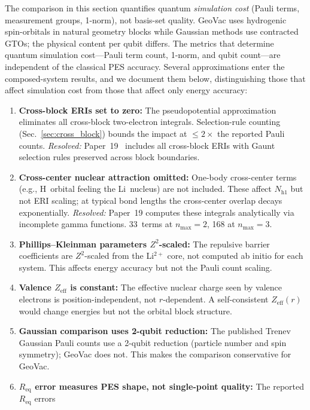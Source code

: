 \documentclass[aps,pra,twocolumn,superscriptaddress,longbibliography]{revtex4-2}
\begin{document}
The comparison in this section quantifies quantum \emph{simulation cost}
(Pauli terms, measurement groups, 1-norm), not basis-set quality.
GeoVac uses hydrogenic spin-orbitals in natural geometry blocks while
Gaussian methods use contracted GTOs; the physical content per qubit
differs.  The metrics that determine quantum simulation cost---Pauli
term count, 1-norm, and qubit count---are independent of the classical
PES accuracy.  Several approximations enter the composed-system
results, and we document them below, distinguishing those that affect
simulation cost from those that affect only energy accuracy:
\begin{enumerate}
\item \textbf{Cross-block ERIs set to zero:} The pseudopotential
  approximation eliminates all cross-block two-electron integrals.
  Selection-rule counting (Sec.~\ref{sec:cross_block}) bounds the
  impact at $\le 2\times$ the reported Pauli counts.
  \textit{Resolved:} Paper~19~\cite{loutey_paper19} includes all
  cross-block ERIs with Gaunt selection rules preserved across
  block boundaries.
\item \textbf{Cross-center nuclear attraction omitted:} One-body
  cross-center terms (e.g., H~orbital feeling the Li~nucleus) are
  not included.  These affect $N_{\mathrm{h1}}$ but not ERI scaling;
  at typical bond lengths the cross-center overlap decays
  exponentially.
  \textit{Resolved:} Paper~19 computes these integrals analytically
  via incomplete gamma functions.  33~terms at $n_{\max}=2$,
  168 at $n_{\max}=3$.
\item \textbf{Phillips--Kleinman parameters $Z^2$-scaled:} The
  repulsive barrier coefficients are $Z^2$-scaled from the
  Li$^{2+}$ core, not computed ab initio for each system.  This
  affects energy accuracy but not the Pauli count scaling.
\item \textbf{Valence $Z_{\mathrm{eff}}$ is constant:} The effective
  nuclear charge seen by valence electrons is position-independent,
  not $r$-dependent.  A self-consistent $Z_{\mathrm{eff}}(r)$ would
  change energies but not the orbital block structure.
\item \textbf{Gaussian comparison uses 2-qubit reduction:} The
  published Trenev Gaussian Pauli counts use a 2-qubit reduction
  (particle number and spin symmetry); GeoVac does not.  This
  makes the comparison conservative for GeoVac.
\item \textbf{$R_{\mathrm{eq}}$ error measures PES shape, not
  single-point quality:} The reported $R_{\mathrm{eq}}$ errors

\end{enumerate}
\end{document}
